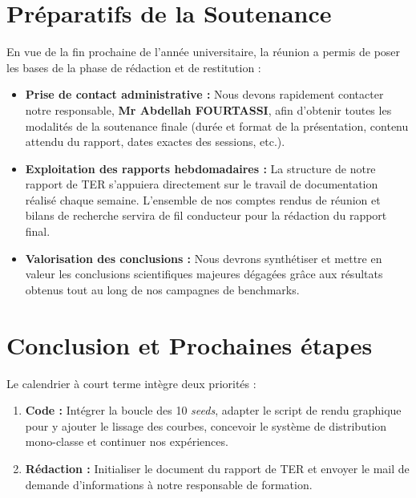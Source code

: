 \documentclass[11pt, a4paper]{article}
\begin{document}
\section{Préparatifs de la Soutenance}
En vue de la fin prochaine de l'année universitaire, la réunion a permis de poser les bases de la phase de rédaction et de restitution :

\begin{itemize}
    \item \textbf{Prise de contact administrative :} Nous devons rapidement contacter notre responsable, \textbf{Mr Abdellah FOURTASSI}, afin d'obtenir toutes les modalités de la soutenance finale (durée et format de la présentation, contenu attendu du rapport, dates exactes des sessions, etc.).
    \item \textbf{Exploitation des rapports hebdomadaires :} La structure de notre rapport de TER s'appuiera directement sur le travail de documentation réalisé chaque semaine. L'ensemble de nos comptes rendus de réunion et bilans de recherche servira de fil conducteur pour la rédaction du rapport final.
    \item \textbf{Valorisation des conclusions :} Nous devrons synthétiser et mettre en valeur les conclusions scientifiques majeures dégagées grâce aux résultats obtenus tout au long de nos campagnes de benchmarks.
\end{itemize}

\section{Conclusion et Prochaines étapes}
Le calendrier à court terme intègre deux priorités :
\begin{enumerate}
    \item \textbf{Code :} Intégrer la boucle des 10 \textit{seeds}, adapter le script de rendu graphique pour y ajouter le lissage des courbes, concevoir le système de distribution mono-classe et continuer nos expériences.
    \item \textbf{Rédaction :} Initialiser le document du rapport de TER et envoyer le mail de demande d'informations à notre responsable de formation.
\end{enumerate}
\end{document}
